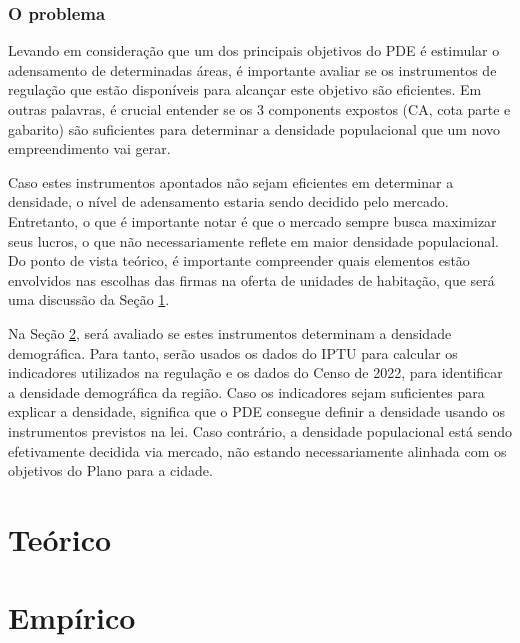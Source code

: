 \subsection*{\textbf{O problema}}

Levando em consideração que um dos principais objetivos do PDE é estimular o adensamento de determinadas áreas, é importante avaliar se os instrumentos de regulação que estão disponíveis para alcançar este objetivo são eficientes. Em outras palavras, é crucial entender se os 3 components expostos (CA, cota parte e gabarito) são suficientes para determinar a densidade populacional que um novo empreendimento vai gerar. 

Caso estes instrumentos apontados não sejam eficientes em determinar a densidade, o nível de adensamento estaria sendo decidido pelo mercado. Entretanto, o que é importante notar é que o mercado sempre busca maximizar seus lucros, o que não necessariamente reflete em maior densidade populacional. Do ponto de vista teórico, é importante compreender quais elementos estão envolvidos nas escolhas das firmas na oferta de unidades de habitação, que será uma discussão da Seção \ref{sec:micro}.

Na Seção \ref{sec:emp}, será avaliado se estes instrumentos determinam a densidade demográfica. Para tanto, serão usados os dados do IPTU para calcular os indicadores utilizados na regulação e os dados do Censo de 2022, para identificar a densidade demográfica da região. Caso os indicadores sejam suficientes para explicar a densidade, significa que o PDE consegue definir a densidade usando os instrumentos previstos na lei. Caso contrário, a densidade populacional está sendo efetivamente decidida via mercado, não estando necessariamente alinhada com os objetivos do Plano para a cidade.

\chapter{Teórico}
\label{sec:micro}


\chapter{Empírico}
\label{sec:emp}